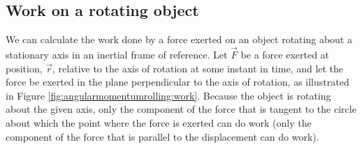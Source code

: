 \subsection{Work on a rotating object}
We can calculate the work done by a force exerted on an object rotating about a stationary axis in an inertial frame of reference. Let $\vec F$ be a force exerted at position, $\vec r$, relative to the axis of rotation at some instant in time, and let the force be exerted in the plane perpendicular to the axis of rotation, as illustrated in Figure \ref{fig:angularmomentumrolling:work}. Because the object is rotating about the given axis, only the component of the force that is tangent to the circle about which the point where the force is exerted can do work (only the component of the force that is parallel to the displacement can do work). 

